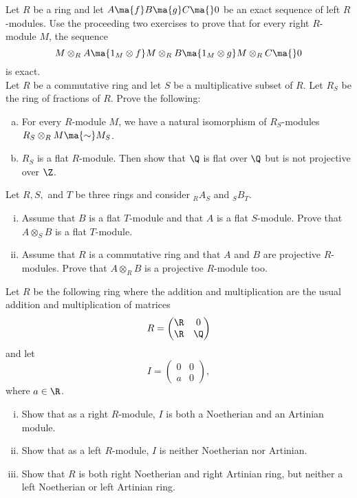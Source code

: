 \prob Let $R$ be a ring and let $A \ma{f} B \ma{g} C \ma{} 0$ be an exact sequence of left $R$-modules. Use the proceeding two exercises to prove that for every right $R$-module $M$, the sequence 
	\[
	M \otimes_R A \ma{1_M \otimes f} M \otimes_R B \ma{1_M \otimes g} M \otimes_R C \ma{} 0
	\]
is exact. \\


\prob Let $R$ be a commutative ring and let $S$ be a multiplicative subset of $R$. Let $R_S$ be the ring of fractions of $R$. Prove the following:
	\begin{enumerate}[(a)]
	\item For every $R$-module $M$, we have a natural isomorphism of $R_S$-modules $R_S \otimes_R M \ma{\sim} M_S$. 
	\item $R_S$ is a flat $R$-module. Then show that $\Q$ is flat over $\Q$ but is not projective over $\Z$. \\
	\end{enumerate}


\prob Let $R,S,$ and $T$ be three rings and consider $_R A_S$ and $_S B_T$.
	\begin{enumerate}[(i)]
	\item Assume that $B$ is a flat $T$-module and that $A$ is a flat $S$-module. Prove that $A \otimes_S B$ is a flat $T$-module.
	\item Assume that $R$ is a commutative ring and that $A$ and $B$ are projective $R$-modules. Prove that $A \otimes_R B$ is a projective $R$-module too. \\
	\end{enumerate}


\prob Let $R$ be the following ring where the addition and multiplication are the usual addition and multiplication of matrices
	\[ R=\begin{pmatrix} \R & 0 \\ \R & \Q \end{pmatrix} \]
and let 
	\[ I=\begin{pmatrix} 0 & 0 \\ a & 0 \end{pmatrix}, \]
where $a \in \R$.
	\begin{enumerate}[(i)]
	\item Show that as a right $R$-module, $I$ is both a Noetherian and an Artinian module. 
	\item Show that as a left $R$-module, $I$ is neither Noetherian nor Artinian. 
	\item Show that $R$ is both right Noetherian and right Artinian ring, but neither a left Noetherian or left Artinian ring. \\
	\end{enumerate}


